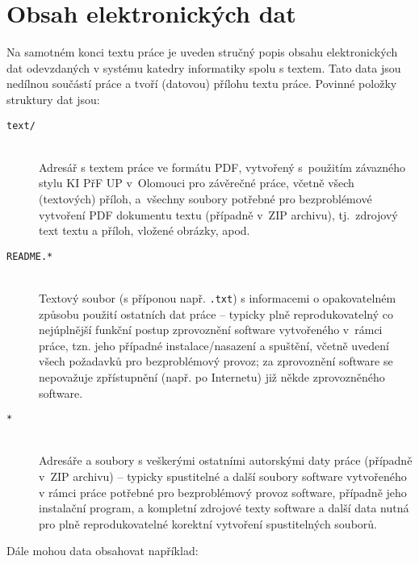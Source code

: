 \documentclass[
program=itp,
  biblatex,
  figures=false,
  glossaries,
  index
]{kidiplom}
\begin{document}
\section{Obsah elektronických dat} \label{sec:ObsahData}

Na samotném konci textu práce je uveden stručný popis obsahu
elektronických dat odevzdaných v systému katedry informatiky spolu s
textem. Tato data jsou nedílnou součástí práce a tvoří (datovou)
přílohu textu práce. Povinné položky struktury dat jsou:

\begin{description}

\item[\texttt{text/}] \hfill \\
  Adresář s textem práce ve formátu PDF, vytvořený s~použitím
  závazného stylu KI PřF UP v~Olomouci pro závěrečné práce, včetně
  všech (textových) příloh, a~všechny soubory potřebné pro
  bezproblémové vytvoření PDF dokumentu textu (případně v~ZIP
  archivu), tj.~zdrojový text textu a příloh, vložené obrázky, apod.

\item[\texttt{README.*}] \hfill \\
  Textový soubor (s příponou např. \texttt{.txt}) s informacemi o
  opakovatelném způsobu použití ostatních dat práce -- typicky plně
  reprodukovatelný co nejúplnější funkční postup zprovoznění software
  vytvořeného v~rámci práce, tzn. jeho případné instalace/nasazení a
  spuštění, včetně uvedení všech požadavků pro bezproblémový provoz;
  za zprovoznění software se nepovažuje zpřístupnění (např. po
  Internetu) již někde zprovozněného software.

\item[\texttt{*}] \hfill \\
  Adresáře a soubory s veškerými ostatními autorskými daty práce
  (případně v~ZIP archivu) -- typicky spustitelné a další soubory
  software vytvořeného v rámci práce potřebné pro bezproblémový provoz
  software, případně jeho instalační program, a kompletní zdrojové
  texty software a další data nutná pro plně reprodukovatelné korektní
  vytvoření spustitelných souborů.

\end{description}

Dále mohou data obsahovat například:
\end{document}
